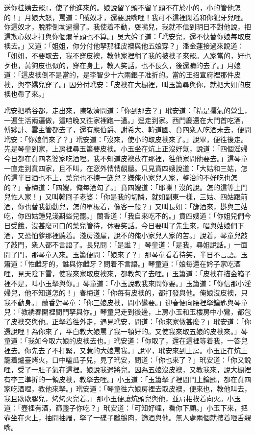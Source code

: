 送你桂姨去罷』，使了他進來的。娘說留丫頭不留丫頭不在於小的，小的管他怎的！」月娘大怒，罵道：「賊奴才，還要說嘴哩！我可不這裡閑着和你犯牙兒哩。你這奴才，脫脖倒坳過揚了。我使着不動，耍嘴兒，我就不信到明日不對他說，把這欺心奴才打與你個爛羊頭也不算。」吳大妗子道：「玳安兒，還不快替你娘每取皮襖去。」又道：「姐姐，你分付他拏那裡皮襖與他五娘穿？」潘金蓮接過來說道：「姐姐，不要取去，我不穿皮襖，教他家裡稍了我的披襖子來罷。人家當的，好也歹也，黃狗皮也似的，{}穿在身上，教人笑話，也不長久，後還贖的去了。」{}月娘道：「這皮襖倒不是當的，是李智少十六兩銀子准折的。當的王招宣府裡那件皮襖，與李嬌兒穿了。」因分付玳安：「皮襖在大橱裡，叫玉簫尋與你，就把大姐的皮襖也帶了來。」

玳安把嘴谷都，走出來，陳敬濟問道：「你到那去？」玳安道：「精是攮氣的營生，一遍生活兩遍做，這咱晚又徃家裡跑一遭。」逕走到家。西門慶還在大門首吃酒，傅夥計、雲主管都去了，還有應伯爵、謝希大、韓道國、賁四衆人吃酒未去，便問玳安：「你娘們來了？」玳安道：「沒來，使小的取皮襖來了。」說畢，便徃後走。先是琴童到家，上房裡尋玉簫要皮襖。小玉坐在炕上正沒好氣，說道：「四個淫婦今日都在賁四老婆家吃酒哩。我不知道皮襖放在那裡，徃他家問他要去。」這琴童一直走到賁四家，且不叫，在窓外悄悄覷聽。只見賁四嫂說道：「大姑和三姑，怎的這半日酒也不上，菜兒也不揀一筯兒？嫌俺小家兒人家，整治的不好吃也怎的？」春梅道：「四嫂，俺每酒勾了。」賁四嫂道：「耶嚛！沒的說。怎的這等上門兒恠人家！」又叫韓囘子老婆：「你是我的切隣，就如副東一樣，三姑、四姑跟前酒，你也替我勸勸兒，怎的單板着，像客一般？」又叫長姐：「篩酒來，斟與三姑吃，你四姑鍾兒淺斟些兒罷。」蘭香道：「我自來吃不的。」賁四嫂道：「你姐兒們今日受餓，沒甚麼可口的菜兒管待，休要笑話。今日要叫了先生來，唱與姑娘們下酒，又恐怕爹那裡聽着。淺房淺屋，說不的俺小家兒人家的苦。」說着，琴童兒敲了敲門，衆人都不言語了。長兒問：「是誰？」琴童道：「是我，尋姐說話。」一面開了門，那琴童入來。玉簫便問：「娘來了？」那琴童看着待笑，半日不言語。玉簫道：「恠雌牙的，誰與你雌牙？問着不言語。」琴童道：「娘每還在妗子家吃酒哩，見天陰下雪，使我來家取皮襖來，都教包了去哩。」玉簫道：「皮襖在描金箱子裡不是，叫小玉拏與你。」琴童道：「小玉說教我來問你要。」玉簫道：「你信那小淫婦兒，他不知道怎的！」春梅道：「你每有皮襖的，都打發與他。俺娘沒皮襖，只我不動身。」蘭香對琴童：「你三娘皮襖，問小鸞要。」迎春便向腰裡拏鑰匙與琴童兒：「教綉春開裡間門拏與你。」琴童兒走到後邊，上房小玉和玉樓房中小鸞，都包了皮襖交與他。正拏着徃外走，遇見玳安，問道：「你來家做甚麼？」玳安道：「你還說哩！為你來了，平白教大娘罵了我一頓好的。又使我來取五娘的皮襖來。」琴童道：「我如今取六娘的皮襖去也。」玳安道：「你取了，還在這裡等着我，一答兒裡去。你先去了不打緊，又惹的大娘罵我。」說畢，玳安來到上房。小玉正在炕上籠着爐臺烤火，口中嗑瓜子兒，見了玳安，問道：「你也來了？」玳安道：「你又說哩，受了一肚子氣在這裡。娘說我遣將兒。因為五娘沒皮襖，又教我來，說大橱裡有李三準折的一領皮襖，教拏去哩。」小玉道：「玉簫拏了裡間門上鑰匙，都在賁四家吃酒哩，教他來拏。」玳安道：「琴童徃六娘房裡去取皮襖，便來也，教他叫去，我且歇歇腿兒，烤烤火兒着。」那小玉便讓炕頭兒與他，並肩相挨着向火。小玉道：「壺裡有酒，篩盞子你吃？」玳安道：「可知好哩，看你下顧。」小玉下來，把壺坐在火上，抽開抽屜，拏了一碟子臘鵝肉，篩酒與他。無人處兩個就摟着咂舌親嘴。

